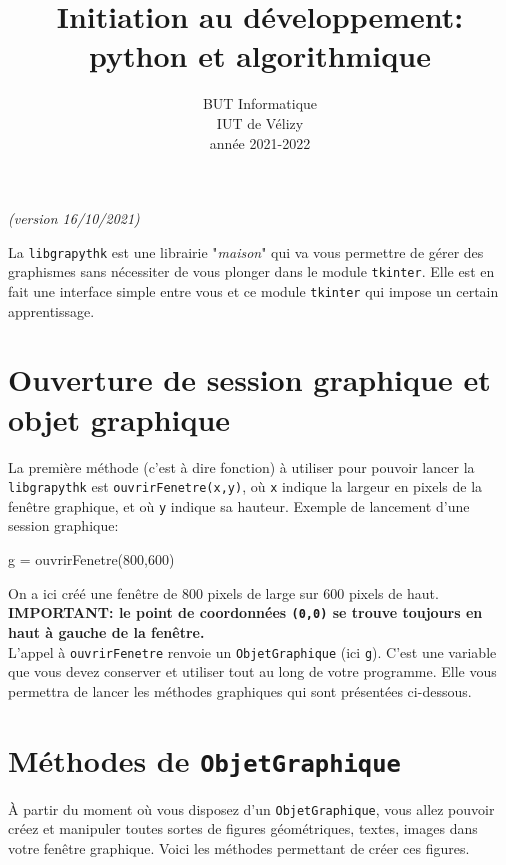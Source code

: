 \documentclass[11pt,a4paper]{article}
\title{Initiation au développement: python et algorithmique}
\author{BUT Informatique\\
IUT de Vélizy\\
année 2021-2022}
\date{}
\begin{document}





\thispagestyle{empty}


\newpage 
\hfill {\it (version 16/10/2021)}
\begin{center}
\end{center}

La {\tt libgrapythk} est une librairie "{\it maison}" qui va vous permettre de gérer des graphismes sans nécessiter de vous plonger dans le module {\tt tkinter}. Elle est en fait une interface simple entre vous et ce module {\tt tkinter} qui impose un certain apprentissage.

\section{Ouverture de session graphique et objet graphique}
La première méthode (c'est à dire fonction) à utiliser pour pouvoir lancer la {\tt libgrapythk} est {\tt ouvrirFenetre(x,y)}, où {\tt x} indique la largeur en pixels de la fenêtre graphique, et où {\tt y} indique sa hauteur. Exemple de lancement d'une session graphique:
\begin{ccode}
    g = ouvrirFenetre(800,600)
\end{ccode}
On a ici créé une fenêtre de 800 pixels de large sur 600 pixels de haut.\\
{\bf IMPORTANT: le point de coordonnées {\tt (0,0)} se trouve toujours en haut à gauche de la fenêtre.}\\

L'appel à {\tt ouvrirFenetre} renvoie un {\tt ObjetGraphique} (ici {\tt g}). C'est une variable que vous devez conserver et utiliser tout au long de votre programme. Elle vous permettra de lancer les méthodes graphiques qui sont présentées ci-dessous.

\section{Méthodes de {\tt ObjetGraphique}}
\`A partir du moment où vous disposez d'un {\tt ObjetGraphique}, vous allez pouvoir créez et manipuler toutes sortes de figures géométriques, textes, images dans votre fenêtre graphique. Voici les méthodes permettant de créer ces figures.
\end{document}

